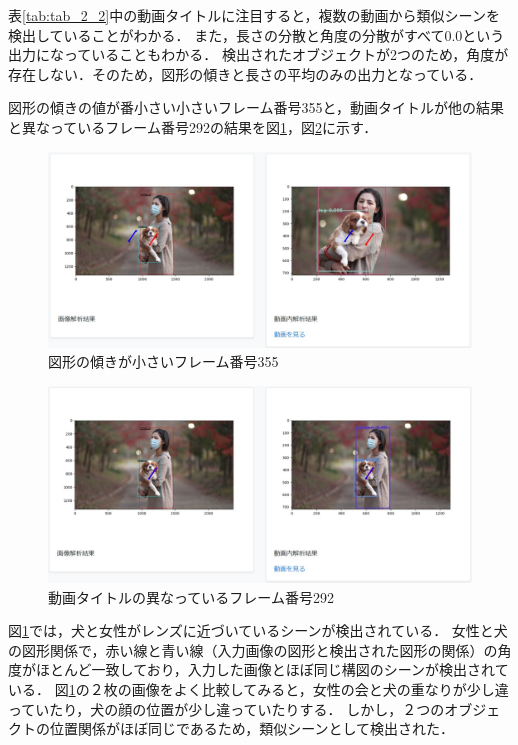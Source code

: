 \documentclass[a4j,12pt,dvipdfmx]{jreport}
\begin{document}
表\ref{tab:tab_2_2}中の動画タイトルに注目すると，複数の動画から類似シーンを検出していることがわかる．
また，長さの分散と角度の分散がすべて0.0という出力になっていることもわかる．
検出されたオブジェクトが2つのため，角度が存在しない．そのため，図形の傾きと長さの平均のみの出力となっている．

図形の傾きの値が番小さい小さいフレーム番号355と，動画タイトルが他の結果と異なっているフレーム番号292の結果を図\ref{fig:img_2_2_3}，図\ref{fig:img_2_2_4}に示す．
\begin{figure}[H]
  \centering
  \includegraphics[width=13cm]{image/result2_2_3.jpg}
  \caption{図形の傾きが小さいフレーム番号355}
  \label{fig:img_2_2_3}
\end{figure}

\begin{figure}[H]
  \centering
  \includegraphics[width=13cm]{image/result2_2_4.jpg}
  \caption{動画タイトルの異なっているフレーム番号292}
  \label{fig:img_2_2_4}
\end{figure}

図\ref{fig:img_2_2_3}では，犬と女性がレンズに近づいているシーンが検出されている．
女性と犬の図形関係で，赤い線と青い線（入力画像の図形と検出された図形の関係）の角度がほとんど一致しており，入力した画像とほぼ同じ構図のシーンが検出されている．
図\ref{fig:img_2_2_3}の２枚の画像をよく比較してみると，女性の会と犬の重なりが少し違っていたり，犬の顔の位置が少し違っていたりする．
しかし，２つのオブジェクトの位置関係がほぼ同じであるため，類似シーンとして検出された．
\end{document}
